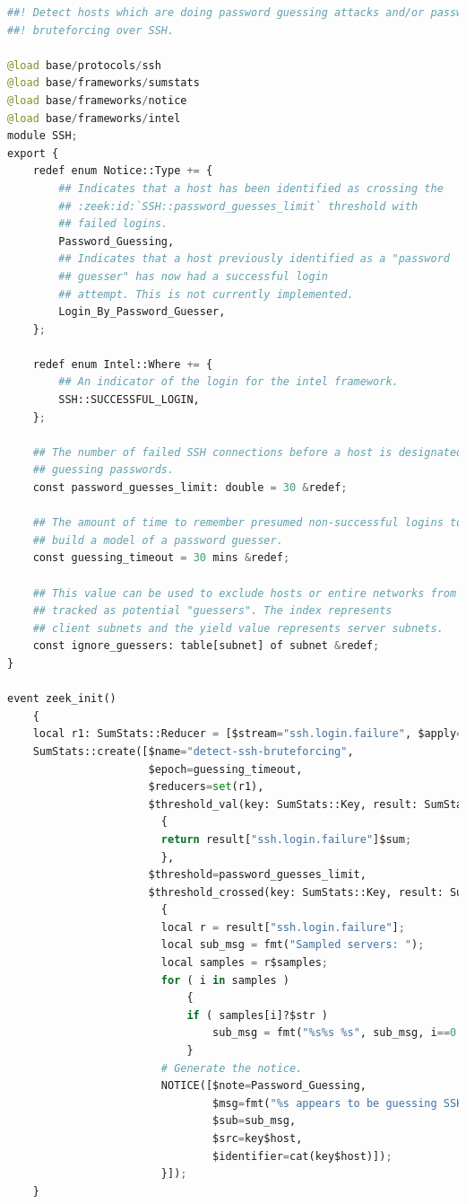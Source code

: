 \begin{lstlisting}[language=Python, caption=detect-bruteforcing.zeek]
##! Detect hosts which are doing password guessing attacks and/or password
##! bruteforcing over SSH.

@load base/protocols/ssh
@load base/frameworks/sumstats
@load base/frameworks/notice
@load base/frameworks/intel
module SSH;
export {
	redef enum Notice::Type += {
		## Indicates that a host has been identified as crossing the
		## :zeek:id:`SSH::password_guesses_limit` threshold with
		## failed logins.
		Password_Guessing,
		## Indicates that a host previously identified as a "password
		## guesser" has now had a successful login
		## attempt. This is not currently implemented.
		Login_By_Password_Guesser,
	};

	redef enum Intel::Where += {
		## An indicator of the login for the intel framework.
		SSH::SUCCESSFUL_LOGIN,
	};

	## The number of failed SSH connections before a host is designated as
	## guessing passwords.
	const password_guesses_limit: double = 30 &redef;

	## The amount of time to remember presumed non-successful logins to
	## build a model of a password guesser.
	const guessing_timeout = 30 mins &redef;

	## This value can be used to exclude hosts or entire networks from being
	## tracked as potential "guessers". The index represents
	## client subnets and the yield value represents server subnets.
	const ignore_guessers: table[subnet] of subnet &redef;
}

event zeek_init()
	{
	local r1: SumStats::Reducer = [$stream="ssh.login.failure", $apply=set(SumStats::SUM, SumStats::SAMPLE), $num_samples=5];
	SumStats::create([$name="detect-ssh-bruteforcing",
	                  $epoch=guessing_timeout,
	                  $reducers=set(r1),
	                  $threshold_val(key: SumStats::Key, result: SumStats::Result) =
	                  	{
	                  	return result["ssh.login.failure"]$sum;
	                  	},
	                  $threshold=password_guesses_limit,
	                  $threshold_crossed(key: SumStats::Key, result: SumStats::Result) =
	                  	{
	                  	local r = result["ssh.login.failure"];
	                  	local sub_msg = fmt("Sampled servers: ");
	                  	local samples = r$samples;
	                  	for ( i in samples )
	                  		{
	                  		if ( samples[i]?$str )
	                  			sub_msg = fmt("%s%s %s", sub_msg, i==0 ? "":",", samples[i]$str);
	                  		}
	                  	# Generate the notice.
	                  	NOTICE([$note=Password_Guessing,
	                  	        $msg=fmt("%s appears to be guessing SSH passwords (seen in %d connections).", key$host, r$num),
	                  	        $sub=sub_msg,
	                  	        $src=key$host,
	                  	        $identifier=cat(key$host)]);
	                  	}]);
	}


\end{lstlisting}
